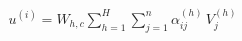 \documentclass[preview]{standalone}
\begin{document}
\begin{align*}
u^{(i)} = W_{h,c}\sum_{h=1}^{H}\sum_{j=1}^{n} \alpha_{ij}^{(h)}\,V_{j}^{(h)}
\end{align*}
\end{document}
